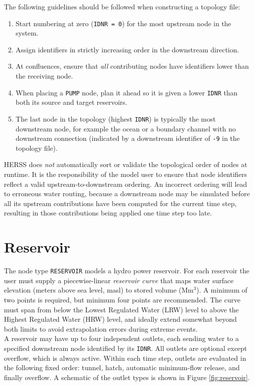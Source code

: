 \documentclass[a4paper, 12pt]{report}
\begin{document}
	The following guidelines should be followed when constructing a topology file:
	
	\begin{enumerate}
		\item Start numbering at zero (\texttt{IDNR = 0}) for the most upstream node in the system.
		\item Assign identifiers in strictly increasing order in the downstream direction.
		\item At confluences, ensure that \emph{all} contributing nodes have identifiers lower than the receiving node.
        \item When placing a \texttt{PUMP} node, plan it ahead so it is given a lower \texttt{IDNR} than both its source and target reservoirs.
		\item The last node in the topology (highest \texttt{IDNR}) is typically the most downstream node, for example the ocean or a boundary channel with no downstream connection (indicated by a downstream identifier of \texttt{-9} in the topology file).
	\end{enumerate}
	
	HERSS does \emph{not} automatically sort or validate the topological order of nodes at runtime. It is the responsibility of the model user to ensure that node identifiers reflect a valid upstream-to-downstream ordering. An incorrect ordering will lead to erroneous water routing, because a downstream node may be simulated before all its upstream contributions have been computed for the current time step, resulting in those contributions being applied one time step too late.
	\newpage


	\section{Reservoir}
	\label{sec:reservoir}

	The node type \texttt{RESERVOIR} models a hydro power reservoir. For each reservoir the user must supply a piecewise-linear \emph{reservoir curve} that maps water surface elevation (meters above sea level, masl) to stored volume (Mm$^3$). A minimum of two points is required, but minimum four points are recommended. The curve must span from below the Lowest Regulated Water (LRW) level to above the Highest Regulated Water (HRW) level, and ideally extend somewhat beyond both limits to avoid extrapolation errors during extreme events. \\

	A reservoir may have up to four independent outlets, each sending water to a specified
	downstream node identified by its \texttt{IDNR}. All outlets are optional except overflow,
	which is always active. Within each time step, outlets are evaluated in the following fixed
	order: tunnel, hatch, automatic minimum-flow release, and finally overflow. A schematic of the
	outlet types is shown in Figure \ref{fig:reservoir}.
	
\end{document}
